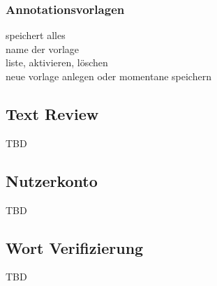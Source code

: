 \subsubsection{Annotationsvorlagen}

speichert alles\\
name der vorlage\\
liste, aktivieren, löschen\\
neue vorlage anlegen oder momentane speichern\\

\subsection{Text Review}

TBD

\subsection{Nutzerkonto}

TBD

\subsection{Wort Verifizierung}

TBD